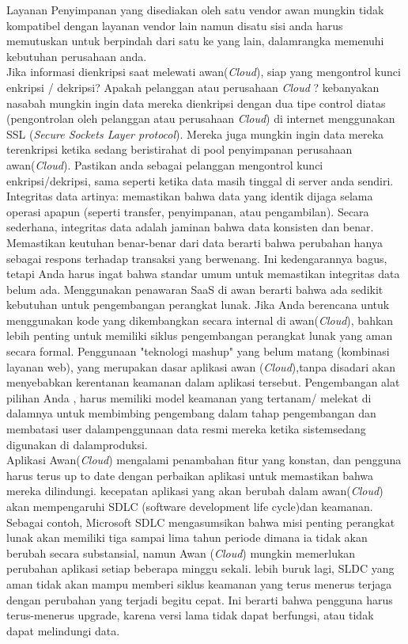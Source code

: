\tab Layanan Penyimpanan yang disediakan oleh satu vendor awan mungkin tidak kompatibel dengan layanan vendor lain namun disatu sisi anda harus memutuskan untuk berpindah dari satu ke yang lain, dalamrangka memenuhi kebutuhan perusahaan anda.\\
Jika informasi dienkripsi saat melewati awan(\textit{Cloud}), siap yang mengontrol kunci enkripsi / dekripsi? Apakah pelanggan atau perusahaan \textit{Cloud} ? kebanyakan nasabah  mungkin  ingin data mereka dienkripsi dengan dua tipe control diatas (pengontrolan oleh pelanggan atau perusahaan \textit{Cloud}) di internet menggunakan SSL (\textit{Secure Sockets  Layer  protocol}).  Mereka juga mungkin ingin data mereka terenkripsi ketika sedang beristirahat di pool penyimpanan perusahaan awan(\textit{Cloud}). Pastikan anda sebagai pelanggan mengontrol kunci enkripsi/dekripsi, sama seperti ketika data masih tinggal di server anda sendiri.\\
\tab Integritas data artinya: memastikan bahwa data yang identik dijaga selama operasi apapun (seperti transfer, penyimpanan, atau pengambilan). Secara sederhana, integritas data adalah jaminan bahwa data konsisten dan benar. Memastikan keutuhan benar-benar dari data berarti bahwa perubahan hanya sebagai respons terhadap transaksi yang berwenang. Ini kedengarannya bagus, tetapi Anda harus ingat bahwa standar umum untuk  memastikan integritas data belum ada. Menggunakan penawaran SaaS di awan berarti bahwa ada sedikit kebutuhan untuk pengembangan perangkat lunak. Jika Anda berencana untuk menggunakan kode yang dikembangkan secara internal di awan(\textit{Cloud}), bahkan lebih penting untuk memiliki siklus pengembangan  perangkat  lunak  yang  aman  secara formal.  Penggunaan "teknologi mashup" yang belum matang (kombinasi layanan web), yang merupakan dasar aplikasi awan (\textit{Cloud}),tanpa disadari akan menyebabkan kerentanan keamanan dalam aplikasi tersebut. Pengembangan alat pilihan Anda , harus memiliki model keamanan yang tertanam/ melekat di dalamnya untuk membimbing pengembang dalam tahap pengembangan dan membatasi user dalampenggunaan data resmi mereka ketika sistemsedang digunakan di dalamproduksi.\\
\tab Aplikasi Awan(\textit{Cloud}) mengalami penambahan fitur yang konstan, dan pengguna harus terus up to date dengan perbaikan aplikasi untuk memastikan bahwa mereka dilindungi. kecepatan aplikasi yang akan berubah dalam awan(\textit{Cloud}) akan  mempengaruhi  SDLC (software    development     life    cycle)dan  keamanan. Sebagai     contoh,     Microsoft SDLC mengasumsikan bahwa misi penting perangkat lunak akan memiliki tiga sampai lima tahun periode dimana ia tidak akan berubah secara substansial, namun Awan (\textit{Cloud}) mungkin memerlukan perubahan aplikasi setiap beberapa minggu sekali. lebih buruk lagi, SLDC yang aman tidak akan mampu memberi siklus keamanan yang terus menerus terjaga dengan perubahan yang terjadi begitu cepat. Ini berarti bahwa pengguna harus terus-menerus upgrade, karena versi lama tidak dapat berfungsi, atau tidak dapat melindungi  data.\\
